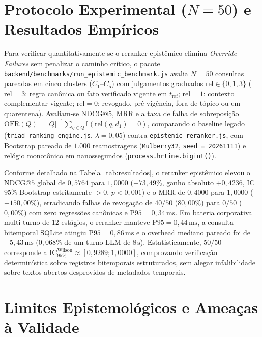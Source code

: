 \documentclass[10pt,twocolumn]{article}
\begin{document}
\section{Protocolo Experimental ($N = 50$) e Resultados Emp\'iricos}

Para verificar quantitativamente se o reranker epist\^emico elimina \emph{Override Failures} sem penalizar o caminho cr\'itico, o pacote \texttt{backend/benchmarks/run\_epistemic\_benchmark.js} avalia $N = 50$ consultas pareadas em cinco clusters ($C_1$--$C_5$) com julgamentos graduados $\mathrm{rel} \in \{0, 1, 3\}$ ($\mathrm{rel}=3$: regra can\^onica ou fato verificado vigente em $t_{\mathrm{ref}}$; $\mathrm{rel}=1$: contexto complementar vigente; $\mathrm{rel}=0$: revogado, pr\'e-vig\^encia, fora de t\'opico ou em quarentena). Avaliam-se $\mathrm{NDCG@5}$, $\mathrm{MRR}$ e a taxa de falha de sobreposi\c{c}\~ao $\mathrm{OFR}(Q) = |Q|^{-1}\sum_{q \in Q}\mathbb{I}(\mathrm{rel}(q,d_1)=0)$, comparando o baseline legado (\texttt{triad\_ranking\_engine.js}, $\lambda = 0{,}05$) contra \texttt{epistemic\_reranker.js}, com Bootstrap pareado de $1.000$ reamostragens (\texttt{Mulberry32}, \texttt{seed = 20261111}) e rel\'ogio monot\^onico em nanossegundos (\texttt{process.hrtime.bigint()}).

Conforme detalhado na Tabela~\ref{tab:resultados}, o reranker epist\^emico elevou o $\mathrm{NDCG@5}$ global de $0{,}5764$ para $1{,}0000$ ($+73{,}49\%$, ganho absoluto $+0{,}4236$, IC $95\%$ Bootstrap estritamente $>0$, $p < 0{,}001$) e o $\mathrm{MRR}$ de $0{,}4000$ para $1{,}0000$ ($+150{,}00\%$), erradicando falhas de revoga\c{c}\~ao de $40/50$ ($80{,}00\%$) para $0/50$ ($0{,}00\%$) com zero regress\~oes can\^onicas e $\mathrm{P95} = 0{,}34\,\mathrm{ms}$. Em bateria corporativa multi-turno de 12 est\'agios, o reranker manteve $\mathrm{P95} = 0{,}44\,\mathrm{ms}$, a consulta bitemporal SQLite atingiu $\mathrm{P95} = 0{,}86\,\mathrm{ms}$ e o overhead mediano pareado foi de $+5{,}43\,\mathrm{ms}$ ($0{,}068\%$ de um turno LLM de $8\,\mathrm{s}$). Estatisticamente, $50/50$ corresponde a $\mathrm{IC}_{95\%}^{\mathrm{Wilson}} \approx [0{,}9289; 1{,}0000]$, comprovando verifica\c{c}\~ao determin\'istica sobre registros bitemporais estruturados, sem alegar infalibilidade sobre textos abertos desprovidos de metadados temporais.

\section{Limites Epistemol\'ogicos e Amea\c{c}as \`a Validade}
\end{document}
